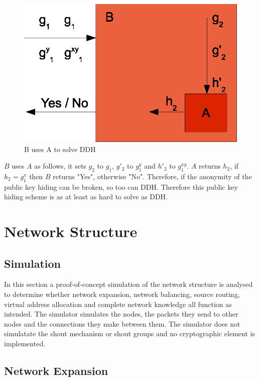 \documentclass[ %
                    author={Luke Murray},
                supervisor={Dr. Simon Hollis},
                     title={Shadow Peer-to-Peer Networks},
                  subtitle={},
                    degree={MEng},
                      year={2013} ]{thesis}
\begin{document}
\begin{figure}[h]
    \centering
    \includegraphics{diagrams/crypto_proof.eps}
    \caption{B uses A to solve DDH}
    \label{crypto_diag}
\end{figure}

$B$ uses $A$ as follows, it sets $g_2$ to $g_1$, $g\prime_2$ to $g_1^{y}$ and $h\prime_2$ to $g_1^{xy}$. $A$ returns $h_2$, if $h_2 = g_1^{x}$ then $B$ returns "Yes", otherwise "No". Therefore, if the anonymity of the public key hiding can be broken, so too can DDH. Therefore this public key hiding scheme is as at least as hard to solve as DDH.

\section{Network Structure}

\subsection{Simulation}

In this section a proof-of-concept simulation of the network structure is analysed to determine whether network expansion, network balancing, source routing, virtual address allocation and complete network knowledge all function as intended. The simulator simulates the nodes, the packets they send to other nodes and the connections they make between them. The simulator does not simulatate the shout mechanism or shout groups and no cryptographic element is implemented.

\subsection{Network Expansion}
\end{document}
